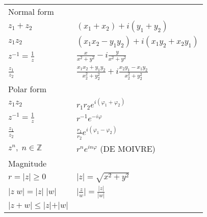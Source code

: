 \begin{tabular}{ m{3cm}  m{5.4cm} }
    Normal form                                        &                                                                        \\
    $z_1+z_2$                                          & $(x_1+x_2)+i(y_1+y_2)$                                                 \\
    $z_1z_2$                                           & $(x_1x_2-y_1y_2)+i(x_1y_2+x_2y_1)$                                     \\
    $z^{-1}=\frac{1}{z}$                               & $\frac{x}{x^2+y^2}-i\frac{y}{x^2+y^2}$                                 \\
    $\frac{z_1}{z_2}$                                  & $\frac{x_1x_2+y_1y_2}{x_2^2+y_2^2}+i\frac{x_2y_1-x_1y_2}{x_2^2+y_2^2}$ \\
    Polar form                                         &                                                                        \\
    $z_1z_2$                                           & $r_1r_2e^{i(\varphi_1+\varphi_2)}$                                     \\
    $z^{-1}=\frac{1}{z}$                               & $r^{-1}e^{-i\varphi}$                                                  \\
    $\frac{z_1}{z_2}$                                  & $\frac{r_1}{r_2}e^{i(\varphi_1-\varphi_2)}$                            \\
    $z^n,\; n\in \mathbb{Z}$                           & $r^n e^{in\varphi}$ {\tiny(DE MOIVRE)}                                 \\
    Magnitude                                          &                                                                        \\
    $r=\vert z \vert \geq 0$                           & $\vert z \vert =\sqrt{x^2+y^2}$                                        \\
    $\vert z \; w \vert =\vert z \vert \;\vert w\vert$ & $\big\vert \frac{z}{w}\big\vert=\frac{\vert z\vert}{\vert w\vert}$     \\
    $\vert z+ w\vert \leq \vert z \vert + \vert w \vert$                                                                        \\
\end{tabular}

\renewcommand{\arraystretch}{1}

